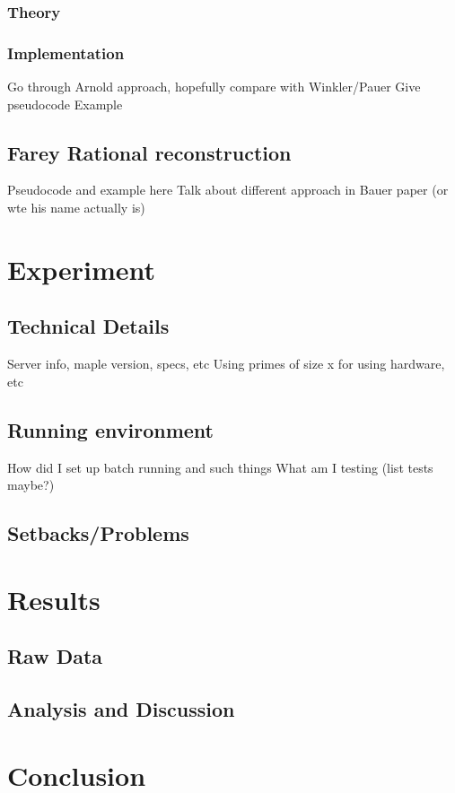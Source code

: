 \documentclass{article}
\begin{document}
\subsubsection{Theory}
\subsubsection{Implementation}
Go through Arnold approach, hopefully compare with Winkler/Pauer
Give pseudocode
Example
\subsection{Farey Rational reconstruction}
Pseudocode and example here
Talk about different approach in Bauer paper (or wte his name actually is)

\section{Experiment}
\subsection{Technical Details}
Server info, maple version, specs, etc
Using primes of size x for using hardware, etc
\subsection{Running environment}
How did I set up batch running and such things
What am I testing (list tests maybe?)
\subsection{Setbacks/Problems}

\section{Results}
\subsection{Raw Data}
\subsection{Analysis and Discussion}

\section{Conclusion}


\begin{appendix}
  \listoffigures
\end{appendix}
\end{document}
